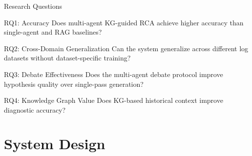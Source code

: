 \documentclass[aspectratio=169]{beamer}
\begin{document}
\begin{frame}{Research Questions}
\begin{block}{RQ1: Accuracy}
Does multi-agent KG-guided RCA achieve higher accuracy than single-agent and RAG baselines?
\end{block}

\begin{block}{RQ2: Cross-Domain Generalization}
Can the system generalize across different log datasets without dataset-specific training?
\end{block}

\begin{block}{RQ3: Debate Effectiveness}
Does the multi-agent debate protocol improve hypothesis quality over single-pass generation?
\end{block}

\begin{block}{RQ4: Knowledge Graph Value}
Does KG-based historical context improve diagnostic accuracy?
\end{block}
\end{frame}

\section{System Design}
\end{document}
